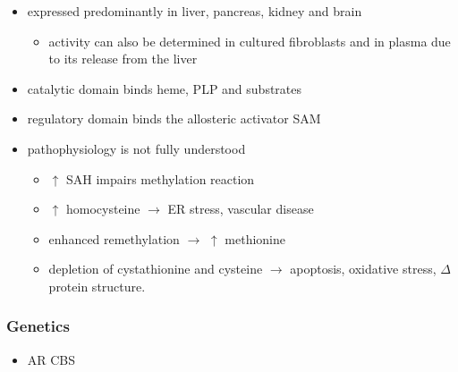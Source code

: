 \documentclass[12pt]{scrartcl}
\begin{document}
\begin{center}
\begin{center}
\begin{itemize}
\item expressed predominantly in liver, pancreas, kidney and brain
\begin{itemize}
\item activity can also be determined in cultured fibroblasts and in plasma
due to its release from the liver
\end{itemize}
\item catalytic domain binds heme, PLP and substrates
\item regulatory domain binds the allosteric activator SAM
\item pathophysiology is not fully understood
\begin{itemize}
\item \(\uparrow\) SAH impairs methylation reaction
\item \(\uparrow\) homocysteine \(\to\) ER stress, vascular disease
\item enhanced remethylation \(\to\) \(\uparrow\) methionine
\item depletion of cystathionine and cysteine \(\to\) apoptosis, oxidative
stress, \(\Delta\) protein structure.
\end{itemize}
\end{itemize}

\subsubsection{Genetics}
\label{sec:org8e45914}
\begin{itemize}
\item AR CBS
\end{itemize}


\end{center}
\end{center}
\end{document}
